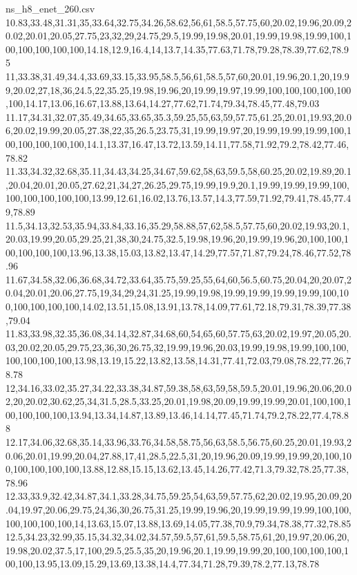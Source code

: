 \begin{filecontents*}[overwrite]{ns_h8_enet_260.csv}
10.83,33.48,31.31,35,33.64,32.75,34.26,58.62,56,61,58.5,57.75,60,20.02,19.96,20.09,20.02,20.01,20.05,27.75,23,32,29,24.75,29.5,19.99,19.98,20.01,19.99,19.98,19.99,100,100,100,100,100,100,14.18,12.9,16.4,14,13.7,14.35,77.63,71.78,79.28,78.39,77.62,78.95
11,33.38,31.49,34.4,33.69,33.15,33.95,58.5,56,61,58.5,57,60,20.01,19.96,20.1,20,19.99,20.02,27,18,36,24.5,22,35.25,19.98,19.96,20,19.99,19.97,19.99,100,100,100,100,100,100,14.17,13.06,16.67,13.88,13.64,14.27,77.62,71.74,79.34,78.45,77.48,79.03
11.17,34.31,32.07,35.49,34.65,33.65,35.3,59.25,55,63,59,57.75,61.25,20.01,19.93,20.06,20.02,19.99,20.05,27.38,22,35,26.5,23.75,31,19.99,19.97,20,19.99,19.99,19.99,100,100,100,100,100,100,14.1,13.37,16.47,13.72,13.59,14.11,77.58,71.92,79.2,78.42,77.46,78.82
11.33,34.32,32.68,35.11,34.43,34.25,34.67,59.62,58,63,59.5,58,60.25,20.02,19.89,20.1,20.04,20.01,20.05,27.62,21,34,27,26.25,29.75,19.99,19.9,20.1,19.99,19.99,19.99,100,100,100,100,100,100,13.99,12.61,16.02,13.76,13.57,14.3,77.59,71.92,79.41,78.45,77.49,78.89
11.5,34.13,32.53,35.94,33.84,33.16,35.29,58.88,57,62,58.5,57.75,60,20.02,19.93,20.1,20.03,19.99,20.05,29.25,21,38,30,24.75,32.5,19.98,19.96,20,19.99,19.96,20,100,100,100,100,100,100,13.96,13.38,15.03,13.82,13.47,14.29,77.57,71.87,79.24,78.46,77.52,78.96
11.67,34.58,32.06,36.68,34.72,33.64,35.75,59.25,55,64,60,56.5,60.75,20.04,20,20.07,20.04,20.01,20.06,27.75,19,34,29,24,31.25,19.99,19.98,19.99,19.99,19.99,19.99,100,100,100,100,100,100,14.02,13.51,15.08,13.91,13.78,14.09,77.61,72.18,79.31,78.39,77.38,79.04
11.83,33.98,32.35,36.08,34.14,32.87,34.68,60,54,65,60,57.75,63,20.02,19.97,20.05,20.03,20.02,20.05,29.75,23,36,30,26.75,32,19.99,19.96,20.03,19.99,19.98,19.99,100,100,100,100,100,100,13.98,13.19,15.22,13.82,13.58,14.31,77.41,72.03,79.08,78.22,77.26,78.78
12,34.16,33.02,35.27,34.22,33.38,34.87,59.38,58,63,59,58,59.5,20.01,19.96,20.06,20.02,20,20.02,30.62,25,34,31.5,28.5,33.25,20.01,19.98,20.09,19.99,19.99,20.01,100,100,100,100,100,100,13.94,13.34,14.87,13.89,13.46,14.14,77.45,71.74,79.2,78.22,77.4,78.88
12.17,34.06,32.68,35.14,33.96,33.76,34.58,58.75,56,63,58.5,56.75,60.25,20.01,19.93,20.06,20.01,19.99,20.04,27.88,17,41,28.5,22.5,31,20,19.96,20.09,19.99,19.99,20,100,100,100,100,100,100,13.88,12.88,15.15,13.62,13.45,14.26,77.42,71.3,79.32,78.25,77.38,78.96
12.33,33.9,32.42,34.87,34.1,33.28,34.75,59.25,54,63,59,57.75,62,20.02,19.95,20.09,20.04,19.97,20.06,29.75,24,36,30,26.75,31.25,19.99,19.96,20,19.99,19.99,19.99,100,100,100,100,100,100,14,13.63,15.07,13.88,13.69,14.05,77.38,70.9,79.34,78.38,77.32,78.85
12.5,34.23,32.99,35.15,34.32,34.02,34.57,59.5,57,61,59.5,58.75,61,20,19.97,20.06,20,19.98,20.02,37.5,17,100,29.5,25.5,35,20,19.96,20.1,19.99,19.99,20,100,100,100,100,100,100,13.95,13.09,15.29,13.69,13.38,14.4,77.34,71.28,79.39,78.2,77.13,78.78

\end{filecontents*}
